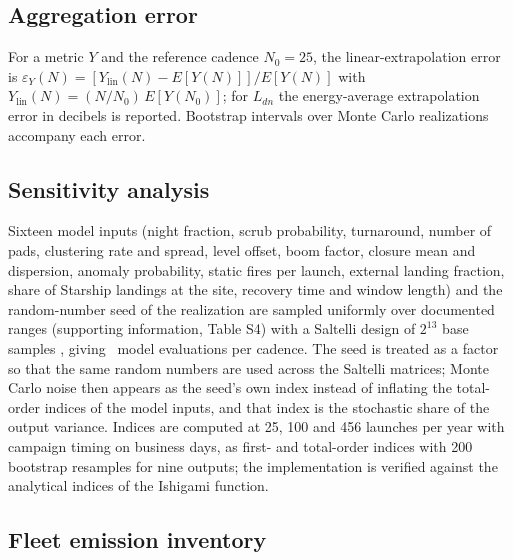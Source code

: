 \documentclass[preprint,12pt,authoryear]{elsarticle}
\begin{document}
\begin{table}[htbp]
\caption{Metric classes, definitions and Poisson closed forms.}
\label{tab:metrics}
\centering\scriptsize
\tableMetricDefinitions
\end{table}

\subsection{Aggregation error}

For a metric $Y$ and the reference cadence $N_0 = 25$, the linear-extrapolation error is $\varepsilon_Y(N) = [Y_{\mathrm{lin}}(N) - E[Y(N)]]/E[Y(N)]$ with $Y_{\mathrm{lin}}(N) = (N/N_0)\,E[Y(N_0)]$; for $L_{dn}$ the energy-average extrapolation error in decibels is reported. Bootstrap intervals over Monte Carlo realizations accompany each error.

\subsection{Sensitivity analysis}

Sixteen model inputs (night fraction, scrub probability, turnaround, number of pads, clustering rate and spread, level offset, boom factor, closure mean and dispersion, anomaly probability, static fires per launch, external landing fraction, share of Starship landings at the site, recovery time and window length) and the random-number seed of the realization are sampled uniformly over documented ranges (supporting information, Table S4) with a Saltelli design of $2^{13}$ base samples \citep{saltelli2010,sobol2001,herman2017}, giving \valESixNEvaluations~model evaluations per cadence. The seed is treated as a factor so that the same random numbers are used across the Saltelli matrices; Monte Carlo noise then appears as the seed's own index instead of inflating the total-order indices of the model inputs, and that index is the stochastic share of the output variance. Indices are computed at 25, 100 and 456 launches per year with campaign timing on business days, as first- and total-order indices with 200 bootstrap resamples for nine outputs; the implementation is verified against the analytical indices of the Ishigami function.

\subsection{Fleet emission inventory}
\end{document}

